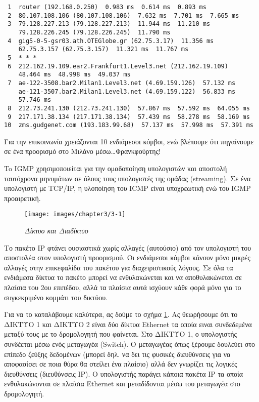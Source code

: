 \begin{inthebox}
\begin{verbatim}
 1  router (192.168.0.250)  0.983 ms  0.614 ms  0.893 ms
 2  80.107.108.106 (80.107.108.106)  7.632 ms  7.701 ms  7.665 ms
 3  79.128.227.213 (79.128.227.213)  11.944 ms  11.210 ms
    79.128.226.245 (79.128.226.245)  11.790 ms
 4  gig5-0-5-gsr03.ath.OTEGlobe.gr (62.75.3.17)  11.356 ms
    62.75.3.157 (62.75.3.157)  11.321 ms  11.767 ms
 5  * * *
 6  212.162.19.109.ear2.Frankfurt1.Level3.net (212.162.19.109) 
    48.464 ms  48.998 ms  49.037 ms
 7  ae-122-3508.bar2.Milan1.Level3.net (4.69.159.126)  57.132 ms
    ae-121-3507.bar2.Milan1.Level3.net (4.69.159.122)  56.833 ms  
    57.746 ms
 8  212.73.241.130 (212.73.241.130)  57.867 ms  57.592 ms  64.055 ms
 9  217.171.38.134 (217.171.38.134)  57.439 ms  58.278 ms  58.169 ms
10  zms.gudgenet.com (193.183.99.68)  57.137 ms  57.998 ms  57.391 ms
\end{verbatim}
\normalsize
Για την επικοινωνία χρειάζονται 10 ενδιάμεσοι κόμβοι, ενώ βλέπουμε ότι πηγαίνουμε σε ένα προορισμό στο Μιλάνο μέσω\ldots Φρανκφούρτης!\\
\end{inthebox}

To IGMP χρησιμοποιείται για την ομαδοποίηση υπολογιστών και αποστολή ταυτόχρονα μηνυμάτων σε όλους τους υπολογιστές της ομάδας (streaming). Σε ένα υπολογιστή με TCP/IP, η υλοποίηση του ICMP είναι υποχρεωτική ενώ του IGMP προαιρετική.

\begin{figure}[!ht]
  \centering
  \texttt{[image: images/chapter3/3-1]}
  \caption {\textsl{Δίκτυο και Διαδίκτυο}}
  \label{3-1}
\end{figure}

Το πακέτο IP φτάνει ουσιαστικά χωρίς αλλαγές (αυτούσιο) από τον υπολογιστή του αποστολέα στον υπολογιστή προορισμού. Οι ενδιάμεσοι κόμβοι κάνουν μόνο μικρές αλλαγές στην επικεφαλίδα του πακέτου για διαχειριστικούς λόγους. Σε όλα τα ενδιάμεσα δίκτυα το πακέτο μπορεί να ενθυλακώνεται και να αποθυλακώνεται σε πλαίσια του 2ου επιπέδου, αλλά τα πλαίσια αυτά ισχύουν κάθε φορά μόνο για το συγκεκριμένο κομμάτι του δικτύου.

Για να το καταλάβουμε καλύτερα, ας δούμε το σχήμα \ref{3-1}. Ας θεωρήσουμε ότι το ΔΙΚΤΥΟ 1 και ΔΙΚΤΥΟ 2 είναι δύο δίκτυα Ethernet τα οποία ειναι συνδεδεμένα μεταξύ τους με το δρομολογητή που φαίνεται.  Στο ΔΙΚΤΥΟ 1, ο υπολογιστής συνδέεται μέσω ενός μεταγωγέα (Switch). Ο μεταγωγέας όπως ξέρουμε δουλεύει στο επίπεδο ζεύξης δεδομένων (μπορεί δηλ. να δει τις φυσικές διευθύνσεις για να αποφασίσει σε ποια θύρα θα στείλει ένα πλαίσιο) αλλά δεν γνωρίζει τις λογικές διευθύνσεις (διευθύνσεις IP). Ο υπολογιστής παράγει κάποια πακέτα IP τα οποία ενθυλακώνονται σε πλαίσια Ethernet και μεταδίδονται μέσω του μεταγωγέα στο δρομολογητή.

